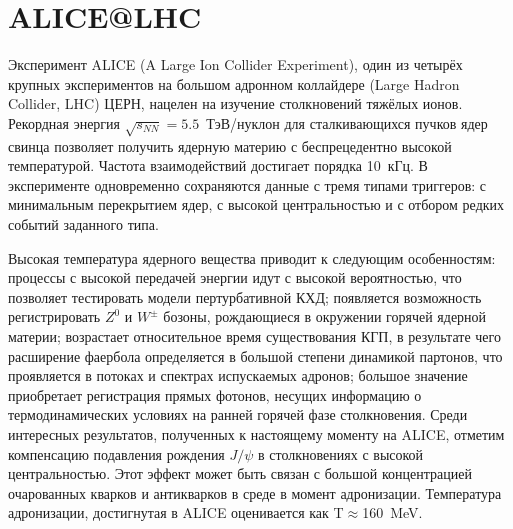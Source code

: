 \section{ALICE@LHC}

Эксперимент ALICE (A Large Ion Collider Experiment), один из четырёх крупных экспериментов на большом адронном коллайдере (Large Hadron Collider, LHC) ЦЕРН, нацелен на изучение столкновений тяжёлых ионов. Рекордная энергия $\sqrt{s_{NN}}=5.5$~\mbox{ТэВ/нуклон} для сталкивающихся пучков ядер свинца позволяет получить ядерную материю с беспрецедентно высокой температурой. Частота взаимодействий достигает порядка 10~кГц. В эксперименте одновременно сохраняются данные с тремя типами триггеров: с минимальным перекрытием ядер, с высокой центральностью и с отбором редких событий заданного типа.

Высокая температура ядерного вещества приводит к следующим особенностям: процессы с высокой передачей энергии идут с высокой вероятностью, что позволяет тестировать модели пертурбативной КХД; появляется возможность регистрировать $Z^{0}$ и $W^{\pm}$ бозоны, рождающиеся в окружении горячей ядерной материи; возрастает относительное время существования КГП, в результате чего расширение фаербола определяется в большой степени динамикой партонов, что проявляется в потоках и спектрах испускаемых адронов; большое значение приобретает регистрация прямых фотонов, несущих информацию о термодинамических условиях на ранней горячей фазе столкновения. Среди интересных результатов, полученных к настоящему моменту на ALICE, отметим компенсацию подавления рождения $J/\psi$ в столкновениях с высокой центральностью. Этот эффект может быть связан с большой концентрацией очарованных кварков и антикварков в среде в момент адронизации. Температура адронизации, достигнутая в ALICE оценивается как T$\approx$160~MeV.




